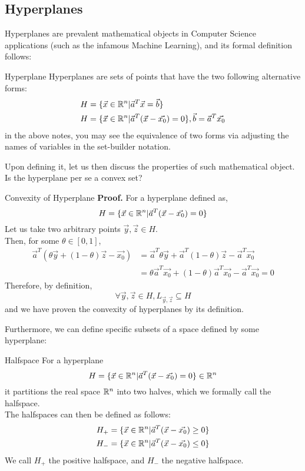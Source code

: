 \subsection{Hyperplanes}
Hyperplanes are prevalent mathematical objects in Computer Science applications (such as the infamous Machine Learning), and its formal definition follows:
\begin{ln-define}{Hyperplane}{}
    Hyperplanes are sets of points that have the two following alternative forms:
    \begin{align*}
        H &= \{\vec{x} \in \mathbb{R}^n | \vec{a}^T \vec{x} = \vec{b}\} \\
        H &= \{\vec{x} \in \mathbb{R}^n | \vec{a}^T (\vec{x} - \vec{x_0}) = 0\}, \vec{b} = \vec{a}^T \vec{x_0}
    \end{align*}
    in the above notes, you may see the equivalence of two forms via adjusting the names of variables in the set-builder notation.
\end{ln-define}
Upon defining it, let us then discuss the properties of such mathematical object.
Is the hyperplane per se a convex set?
\begin{ln-explain}{Convexity of Hyperplane}{}
    \textbf{Proof.} For a hyperplane defined as,
    \[
        H = \{\vec{x} \in \mathbb{R}^n | \vec{a}^T (\vec{x} - \vec{x_0}) = 0\}
    \]
    Let us take two arbitrary points $\vec{y}, \vec{z} \in H$. \\
    Then, for some $\theta \in [0, 1]$,
    \begin{align*}
        \vec{a}^T (\theta \vec{y} + (1 - \theta) \vec{z} - \vec{x_0})
        &= \vec{a}^T \theta \vec{y} + \vec{a}^T (1 - \theta) \vec{z} - \vec{a}^T \vec{x_0} \\
        &= \theta \vec{a}^T \vec{x_0} + (1 - \theta) \vec{a}^T \vec{x_0} - \vec{a}^T \vec{x_0} = 0
    \end{align*}
    Therefore, by definition,
    \[
        \forall \vec{y}, \vec{z} \in H, L_{\vec{y}, \vec{z}} \subseteq H
    \]
    and we have proven the convexity of hyperplanes by its definition.
\end{ln-explain}
Furthermore, we can define specific subsets of a space defined by some hyperplane:
\begin{ln-define}{Halfspace}{}
    For a hyperplane
    \[H = \{\vec{x} \in \mathbb{R}^n | \vec{a}^T (\vec{x} - \vec{x_0}) = 0\} \in \mathbb{R}^n\]
    it partitions the real space $\mathbb{R}^n$ into two halves, which we formally call the halfspace. \\
    The halfspaces can then be defined as follows:
    \begin{align*}
        H_+ &= \{\vec{x} \in \mathbb{R}^n | \vec{a}^T (\vec{x} - \vec{x_0}) \geq 0\} \\
        H_- &= \{\vec{x} \in \mathbb{R}^n | \vec{a}^T (\vec{x} - \vec{x_0}) \leq 0\}
    \end{align*}
    We call $H_+$ the positive halfspace, and $H_-$ the negative halfspace.
\end{ln-define}
